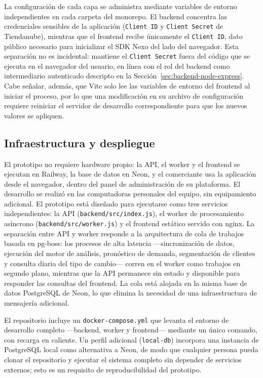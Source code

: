 La configuración de cada capa se administra mediante variables de entorno independientes en cada carpeta del monorepo. El backend concentra las credenciales sensibles de la aplicación (\texttt{Client ID} y \texttt{Client Secret} de Tiendanube), mientras que el frontend recibe únicamente el \texttt{Client ID}, dato público necesario para inicializar el SDK Nexo del lado del navegador. Esta separación no es incidental: mantiene el \texttt{Client Secret} fuera del código que se ejecuta en el navegador del usuario, en línea con el rol del backend como intermediario autenticado descripto en la Sección~\ref{sec:backend-node-express}. Cabe señalar, además, que Vite solo lee las variables de entorno del frontend al iniciar el proceso, por lo que una modificación en su archivo de configuración requiere reiniciar el servidor de desarrollo correspondiente para que los nuevos valores se apliquen.

\subsection{Infraestructura y despliegue}
\label{sec:infraestructura}

El prototipo no requiere hardware propio: la API, el worker y el frontend se ejecutan en Railway, la base de datos en Neon, y el comerciante usa la aplicación desde el navegador, dentro del panel de administración de su plataforma. El desarrollo se realizó en las computadoras personales del equipo, sin equipamiento adicional. El prototipo está diseñado para ejecutarse como tres servicios independientes: la API (\texttt{backend/src/index.js}), el worker de procesamiento asíncrono (\texttt{backend/src/worker.js}) y el frontend estático servido con nginx. La separación entre API y worker responde a la arquitectura de cola de trabajos basada en pg-boss: los procesos de alta latencia ---sincronización de datos, ejecución del motor de análisis, pronóstico de demanda, segmentación de clientes y consulta diaria del tipo de cambio--- corren en el worker como trabajos en segundo plano, mientras que la API permanece sin estado y disponible para responder las consultas del frontend. La cola está alojada en la misma base de datos PostgreSQL de Neon, lo que elimina la necesidad de una infraestructura de mensajería adicional.

El repositorio incluye un \texttt{docker-compose.yml} que levanta el entorno de desarrollo completo ---backend, worker y frontend--- mediante un único comando, con recarga en caliente. Un perfil adicional (\texttt{local-db}) incorpora una instancia de PostgreSQL local como alternativa a Neon, de modo que cualquier persona pueda clonar el repositorio y ejecutar el sistema completo sin depender de servicios externos; esto es un requisito de reproducibilidad del prototipo.

